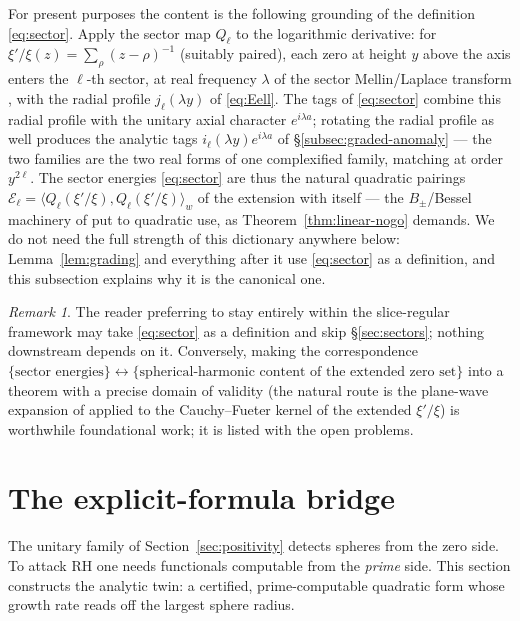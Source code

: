 \documentclass[11pt]{amsart}
\theoremstyle{plain}
\theoremstyle{definition}
\theoremstyle{remark}
\newtheorem{remark}[theorem]{Remark}
\newcommand{\EE}{\mathcal{E}}
\begin{document}
For present purposes the content is the following grounding of the definition
\eqref{eq:sector}. Apply the sector map $Q_\ell$ to the logarithmic derivative: for
$\xi'/\xi(z)=\sum_\rho(z-\rho)^{-1}$ (suitably paired), each zero at height $y$ above the axis
enters the $\ell$-th sector, at real frequency $\lambda$ of the sector Mellin/Laplace transform
\cite[Lemma~6.1, Thm.~6.2]{Baker2016}, with the radial profile $j_\ell(\lambda y)$ of
\eqref{eq:Eell}. The tags of \eqref{eq:sector} combine this radial profile with the unitary
axial character $e^{i\lambda a}$; rotating the radial profile as well produces the analytic
tags $i_\ell(\lambda y)e^{i\lambda a}$ of \S\ref{subsec:graded-anomaly} --- the two families
are the two real forms of one complexified family, matching at order $y^{2\ell}$. The sector
energies
\eqref{eq:sector} are thus the natural quadratic pairings
$\EE_\ell=\langle Q_\ell(\xi'/\xi),Q_\ell(\xi'/\xi)\rangle_w$ of the extension with itself ---
the $B_\pm$/Bessel machinery of \cite{Baker2015} put to quadratic use, as
Theorem~\ref{thm:linear-nogo} demands. We do not need the full strength of this dictionary
anywhere below: Lemma~\ref{lem:grading} and everything after it use \eqref{eq:sector} as a
definition, and this subsection explains why it is the canonical one.

\begin{remark}
The reader preferring to stay entirely within the slice-regular framework may take
\eqref{eq:sector} as a definition and skip \S\ref{sec:sectors}; nothing downstream depends on
it. Conversely, making the correspondence
$\{\text{sector energies}\}\leftrightarrow\{\text{spherical-harmonic content of the extended
zero set}\}$ into a theorem with a precise domain of validity (the natural route is the
plane-wave expansion of \cite[\S\S6--7]{Baker2016} applied to the Cauchy--Fueter kernel of the
extended $\xi'/\xi$) is worthwhile foundational work; it is listed with the open problems.
\end{remark}

\section{The explicit-formula bridge}\label{sec:bridge}

The unitary family of Section~\ref{sec:positivity} detects spheres from the zero side. To attack
RH one needs functionals computable from the \emph{prime} side. This section constructs the
analytic twin: a certified, prime-computable quadratic form whose growth rate reads off the
largest sphere radius.
\end{document}
